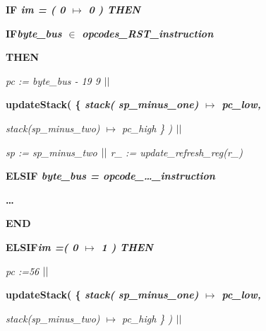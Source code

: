 \documentclass[a4paper]{llncs}
\begin{document}
\begin{sloppypar}

\hspace*{0.00in}\bf IF \it im \rm = \rm ( \rm 0  $\mapsto$  \rm 0 \rm ) \bf THEN  

\hspace*{0.10in}\bf IF\hspace*{0.10in}\it byte\_bus \rm $\in$  \it opcodes\_RST\_instruction

\hspace*{0.10in}\bf THEN\hspace*{1.05in}

\hspace*{0.40in}\it pc \rm := \it byte\_bus \rm - \rm 1\rm 9\rm
9\hspace*{0.10in} $\mbox{$\mid\mid$}$

\hspace*{0.40in}\bf updateStack\rm ( \rm \{ \it stack\rm ( \it
sp\_minus\_one\rm )  $\mapsto$  \it pc\_low\rm ,

\hspace*{0.40in}\it stack\rm (\it sp\_minus\_two\rm )  $\mapsto$  \it pc\_high
\rm \} \rm )  $\mbox{$\mid\mid$}$

\hspace*{0.40in}\it sp \rm := \it sp\_minus\_two  $\mbox{$\mid\mid$}$ \hspace*{0.10in}\it
r\_ \rm := \it update\_refresh\_reg\rm (\it r\_\rm )

\hspace*{0.10in}\bf ELSIF \it byte\_bus \rm = \it opcode\_\ldots\_instruction

\hspace*{0.40in}\bf \ldots 

\hspace*{0.10in}\bf END

\hspace*{0.00in}\bf ELSIF\hspace*{0.10in}\it im \rm =\hspace*{0.10in}\rm ( \rm
0  $\mapsto$  \rm 1 \rm ) \bf THEN

\hspace*{0.10in}\it pc \rm :=\hspace*{0.10in}\rm 5\rm 6  \hspace*{0.80in}
$\mbox{$\mid\mid$}$

\hspace*{0.10in}\bf updateStack\rm ( \rm \{ \it stack\rm (\it
sp\_minus\_one\rm )  $\mapsto$  \it pc\_low\rm ,

\hspace*{0.10in}\it stack\rm (\it sp\_minus\_two\rm )  $\mapsto$  \it pc\_high
\rm \} \rm )  $\mbox{$\mid\mid$}$


\end{sloppypar}
\end{document}

